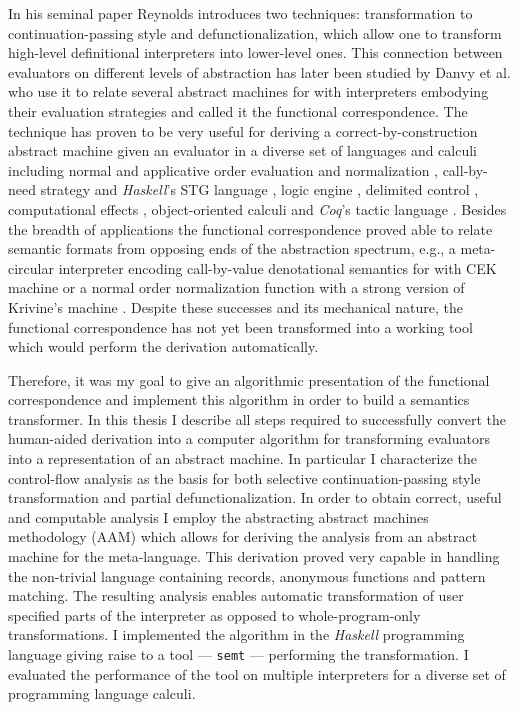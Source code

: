 In his seminal paper \cite{reynolds} Reynolds introduces two techniques: transformation to continuation-passing style and defunctionalization, which allow one to transform high-level definitional interpreters into lower-level ones.
This connection between evaluators on different levels of abstraction has later been studied by Danvy et al.\cite{functional-correspondence} who use it to relate several abstract machines for \LC{} with interpreters embodying their evaluation strategies and called it the functional correspondence.
The technique has proven to be very useful for deriving a correct-by-construction abstract machine given an evaluator in a diverse set of languages and calculi including normal and applicative order \LC{} evaluation \cite{functional-correspondence} and normalization \cite{ager-interpreter-compiler}, call-by-need strategy \cite{ager-call-by-need} and \textit{Haskell}'s STG language \cite{pirog-stg}, logic engine \cite{biernacki-logic-engine}, delimited control \cite{biernacka-delimited-continuations}, computational effects \cite{ager-monadic-evaluators}, object-oriented calculi \cite{danvy-object-oriented} and \textit{Coq}'s tactic language \cite{jedynak-ltac}.
Besides the breadth of applications the functional correspondence proved able to relate semantic formats from opposing ends of the abstraction spectrum, e.g.,
a meta-circular interpreter encoding call-by-value denotational semantics for \LC{} with CEK machine or a normal order normalization function with a strong version of Krivine's machine \cite{ager-interpreter-compiler}.
Despite these successes and its mechanical nature, the functional correspondence has not yet been transformed into a working tool which would perform the derivation automatically.

Therefore, it was my goal to give an algorithmic presentation of the functional correspondence and implement this algorithm in order to build a semantics transformer.
In this thesis I describe all steps required to successfully convert the human-aided derivation into a computer algorithm for transforming evaluators into a representation of an abstract machine.
In particular I characterize the control-flow analysis as the basis for both selective continuation-passing style transformation and partial defunctionalization.
In order to obtain correct, useful and computable analysis I employ the abstracting abstract machines methodology (AAM) \cite{aam} which allows for deriving the analysis from an abstract machine for the meta-language.
This derivation proved very capable in handling the non-trivial language containing records, anonymous functions and pattern matching.
The resulting analysis enables automatic transformation of user specified parts of the interpreter as opposed to whole-program-only transformations.
I implemented the algorithm in the \emph{Haskell} programming language giving raise to a tool --- \texttt{semt} --- performing the transformation.
I evaluated the performance of the tool on multiple interpreters for a diverse set of programming language calculi.

